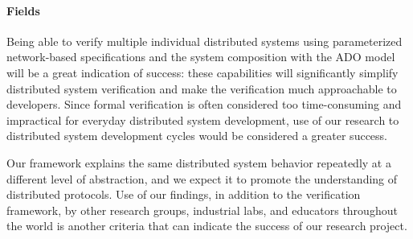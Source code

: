 \documentclass[11pt]{article}
\begin{document}
\paragraph{Fields} Being able to verify multiple individual distributed systems using parameterized 
network-based specifications and the system composition with the ADO
model will be a great indication of success: these capabilities will
significantly simplify distributed system verification and make the
verification much approachable to developers.  Since formal
verification is often considered too time-consuming and impractical
for everyday distributed system development, use of our research to
distributed system development cycles would be considered a greater
success.

Our framework explains the same distributed system behavior repeatedly
at a different level of abstraction, and we expect it to promote the
understanding of distributed protocols.  Use of our findings, in
addition to the verification framework, by other research groups,
industrial labs, and educators throughout the world is another
criteria that can indicate the success of our research project.
\end{document}
